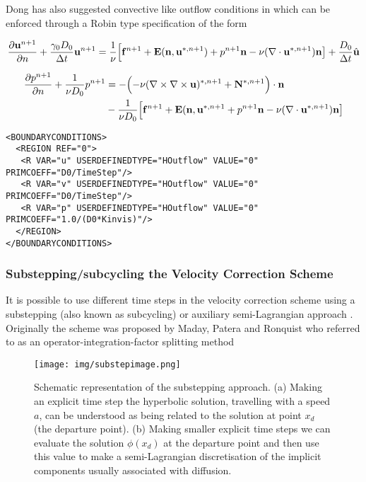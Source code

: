 Dong has also suggested convective like outflow conditions in
\cite{Dong15} which can be enforced through a Robin type specification
of the form

\begin{equation}
  \frac{\partial \mathbf{u}^{n+1}}{\partial n} + \frac{\gamma_0 D_0}{\Delta t} \mathbf{u}^{n+1} = \frac{1}{\nu}\Bigl[\mathbf{f}^{n+1} + \mathbf{E}(\mathbf{n},\mathbf{u}^{*,n+1}) + p^{n+1}\mathbf{n} -\nu(\nabla\cdot \mathbf{u}^{*,n+1}) \mathbf{n}
    \bigr] + \frac{D_0}{\Delta t}\hat{\mathbf{u}}
 \end{equation}

\begin{align}
  \frac{\partial p^{n+1}}{\partial n} + \frac{1}{\nu D_0} p^{n+1} &=
   - \Bigl( -\nu (\nabla \times \nabla \times   \mathbf{u})^{*,n+1} + \mathbf{N}^{*,n+1}\Bigr)\cdot \mathbf{n} \nonumber \\
 & - \frac{1}{\nu D_0}\Bigl[\mathbf{f}^{n+1} + \mathbf{E}(\mathbf{n},\mathbf{u}^{*,n+1} + p^{n+1}\mathbf{n} -\nu(\nabla\cdot \mathbf{u}^{*,n+1}) \mathbf{n}
   \bigr] 
 \end{align}


\begin{lstlisting}[style=XMLStyle]
<BOUNDARYCONDITIONS>
  <REGION REF="0">
   <R VAR="u" USERDEFINEDTYPE="HOutflow" VALUE="0" PRIMCOEFF="D0/TimeStep"/>
   <R VAR="v" USERDEFINEDTYPE="HOutflow" VALUE="0" PRIMCOEFF="D0/TimeStep"/>
   <R VAR="p" USERDEFINEDTYPE="HOutflow" VALUE="0" PRIMCOEFF="1.0/(D0*Kinvis)"/>
  </REGION>
</BOUNDARYCONDITIONS>
\end{lstlisting}

\subsubsection{Substepping/subcycling the Velocity Correction Scheme}

It is possible to use different time steps in the velocity correction
scheme using a substepping (also known as subcycling) \cite{Sh03} or
auxiliary semi-Lagrangian approach \cite{XiShDoKa}. Originally the
scheme was proposed by Maday, Patera and Ronquist who referred to as
an operator-integration-factor splitting method \cite{MaPaRo}

\begin{figure}[!htbp]
\label{fig.substep}
  \centering
 {\texttt{[image: img/substepimage.png]}}
   \caption {Schematic representation of the substepping approach. (a)
     Making an explicit time step the hyperbolic solution, travelling
     with a speed $a$, can be understood as being related to the
     solution at point $x_d$ (the departure point). (b) Making smaller
     explicit time steps we can evaluate the solution $\phi(x_d)$ at
     the departure point and then use this value to make a
     semi-Lagrangian discretisation of the implicit components usually
     associated with diffusion.}
\end{figure}


